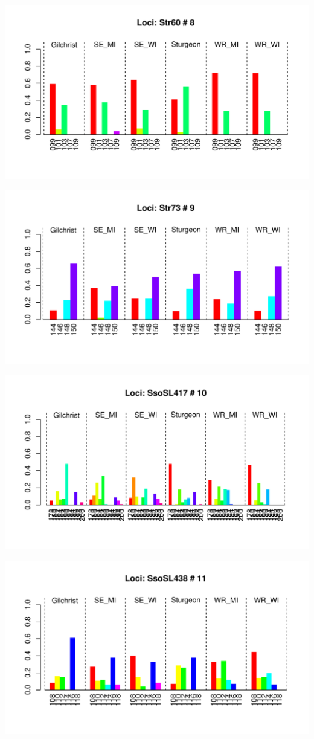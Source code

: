 \documentclass[a4paper]{scrartcl}\usepackage[]{graphicx}\usepackage[]{color}
\makeatletter
\def\maxwidth{ %
  \ifdim\Gin@nat@width>\linewidth
    \linewidth
  \else
    \Gin@nat@width
  \fi
}
\newenvironment{knitrout}{}{} %
\makeatother
\begin{document}
\begin{knitrout}
\includegraphics[width=\maxwidth]{PopGenReport_Hatchery-allelfreq-8} 

\includegraphics[width=\maxwidth]{PopGenReport_Hatchery-allelfreq-9} 

\includegraphics[width=\maxwidth]{PopGenReport_Hatchery-allelfreq-10} 

\includegraphics[width=\maxwidth]{PopGenReport_Hatchery-allelfreq-11} 


\end{knitrout}
\end{document}
